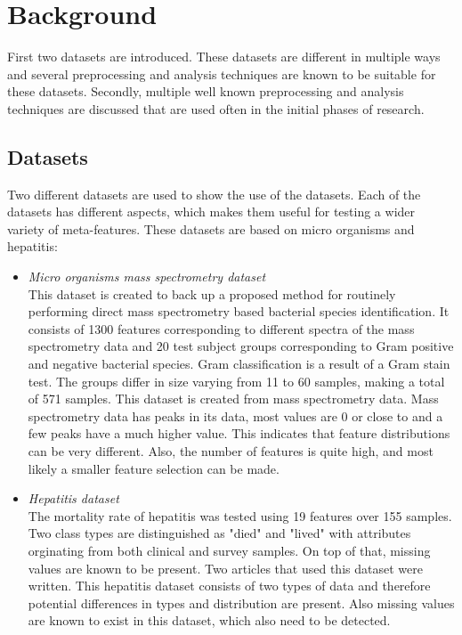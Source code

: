 \documentclass[10pt,a4paper]{article}
\begin{document}
	\section{Background}
	\label{sec:Background}
	
	First two datasets are introduced. These datasets are different in multiple ways and several preprocessing and analysis techniques are known to be suitable for these datasets. Secondly, multiple well known preprocessing and analysis techniques are discussed that are used often in the initial phases of research.
	
	\subsection{Datasets}
	\label{subsec:Datasets}
	
	Two different datasets are used to show the use of the datasets. Each of the datasets has different aspects, which makes them useful for testing a wider variety of meta-features. These datasets are based on micro organisms and hepatitis:
	
	\begin{itemize}
		\item %
		\textit{Micro organisms mass spectrometry dataset} \\ This dataset is created to back up a proposed method for routinely performing direct mass spectrometry based bacterial species identification\cite{doi:10.1093/bioinformatics/btu022}. It consists of 1300 features corresponding to different spectra of the mass spectrometry data and 20 test subject groups corresponding to Gram positive and negative bacterial species. Gram classification is a result of a Gram stain test\cite{madigan2017brock}. The groups differ in size varying from 11 to 60 samples, making a total of 571 samples. 
		This dataset is created from mass spectrometry data. Mass spectrometry data has peaks in its data, most values are 0 or close to and a few peaks have a much higher value. This indicates that feature distributions can be very different. Also, the number of features is quite high, and most likely a smaller feature selection can be made.
		\item \textit{Hepatitis dataset} \\ The mortality rate of hepatitis was tested using 19 features over 155 samples. Two class types are distinguished as "died" and "lived" with attributes orginating from both clinical and survey samples. On top of that, missing values are known to be present. Two articles that used this dataset were written\cite{diaconis1983computer, cestnikkononenkoj}.
		This hepatitis dataset consists of two types of data and therefore potential differences in types and distribution are present. Also missing values are known to exist in this dataset, which also need to be detected.
	\end{itemize}
	
\end{document}

